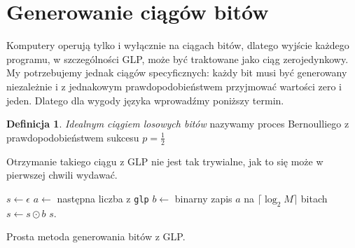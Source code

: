 \documentclass[a4paper,11pt,twoside]{book}
\newcommand{\ceil}[1]{\lceil#1\rceil}
\theoremstyle{definition}
\newtheorem{mydef}{Definicja}[chapter]
\begin{document}
\section{Generowanie ciągów bitów}
Komputery operują tylko i wyłącznie na ciągach bitów, dlatego wyjście każdego programu, w szczególności GLP, może być traktowane jako ciąg zerojedynkowy. My potrzebujemy jednak ciągów specyficznych: każdy bit musi być generowany niezależnie i z jednakowym prawdopodobieństwem przyjmować wartości zero i jeden. Dlatego dla wygody języka wprowadźmy poniższy termin.
\begin{mydef}
 \textit{Idealnym ciągiem losowych bitów} nazywamy proces Bernoulliego z prawdopodobieństwem sukcesu $p = \frac{1}{2}$
\end{mydef}
\noindent Otrzymanie takiego ciągu z GLP nie jest tak trywialne, jak to się może w pierwszej chwili wydawać.

\begin{algorithm}
 \begin{algorithmic}[1]
    \State $s \gets \epsilon$
      \State $a \gets$ następna liczba z \texttt{glp}
      \State $b \gets$ binarny zapis $a$ na $\ceil{\log_2 M}$ bitach
      \State $s \gets s \odot b$
     \EndWhile
    \State \Return $s$.
  \EndFunction
 \end{algorithmic}
 \caption{Prosta metoda generowania bitów z GLP.}
 \label{alg:GenerateBitSequence}
\end{algorithm}

\end{document}
